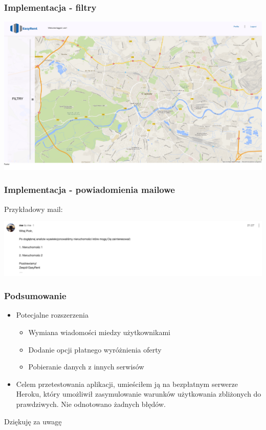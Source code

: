 \documentclass{beamer}
\begin{document}
\begin{frame}
\frametitle{Implementacja - filtry}
\centerline{\includegraphics[scale=0.15]{pictures/after_login.png}}
\end{frame}


\begin{frame}
\frametitle{Implementacja - powiadomienia mailowe}
Przykładowy mail:
\centerline{\includegraphics[scale=0.3]{pictures/example_mail.png}}
\end{frame}


\begin{frame}
\frametitle{Podsumowanie}
\begin{itemize}
\item Potecjalne rozszerzenia
\begin{itemize}
\item Wymiana wiadomości miedzy użytkownikami
\item Dodanie opcji płatnego wyróżnienia oferty
\item Pobieranie danych z innych serwisów
\end{itemize}
\item Celem przetestowania aplikacji, umieściłem ją na bezpłatnym serwerze Heroku, który umożliwił zasymulowanie warunków użytkowania zbliżonych do prawdziwych. Nie odnotowano żadnych błędów.
\end{itemize}
\end{frame}


\begin{frame}
Dziękuję za uwagę
\end{frame}
\end{document}
